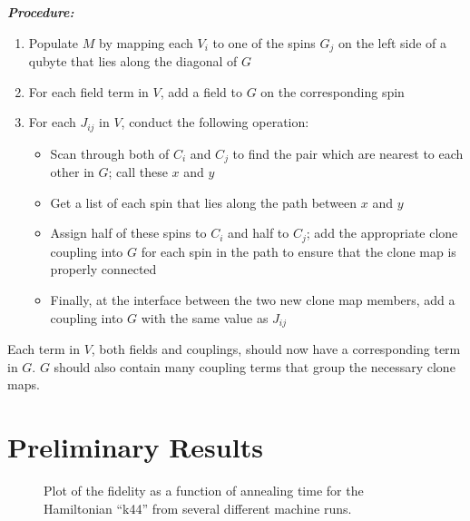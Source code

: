 \documentclass[12pt]{dalthesis}
\begin{document}
\emph{\textbf{Procedure:}}
\begin{enumerate}
	\item Populate $M$ by mapping each $V_i$ to one of the spins $G_j$ on the left side of a qubyte that lies along the diagonal of $G$
	\item For each field term in $V$, add a field to $G$ on the corresponding spin
	\item For each $J_{ij}$ in $V$, conduct the following operation:
		\begin{itemize}
			\item Scan through both of $C_i$ and $C_j$ to find the pair which are nearest to each other in $G$; call these $x$ and $y$
			\item Get a list of each spin that lies along the path between $x$ and $y$
			\item Assign half of these spins to $C_i$ and half to $C_j$; add the appropriate clone coupling into $G$ for each spin in the path to ensure that the clone map is properly connected
			\item Finally, at the interface between the two new clone map members, add a coupling into $G$ with the same value as $J_{ij}$
		\end{itemize}
\end{enumerate}

Each term in $V$, both fields and couplings, should now have a corresponding term in $G$.  $G$ should also contain many coupling terms that group the necessary clone maps.

\chapter{Preliminary Results}

\begin{figure}
	\caption[Fidelity vs Time]{Plot of the fidelity as a function of annealing time for the Hamiltonian ``k44'' from several different machine runs.}
	\label{fid_v_time}
\end{figure}
\end{document}
